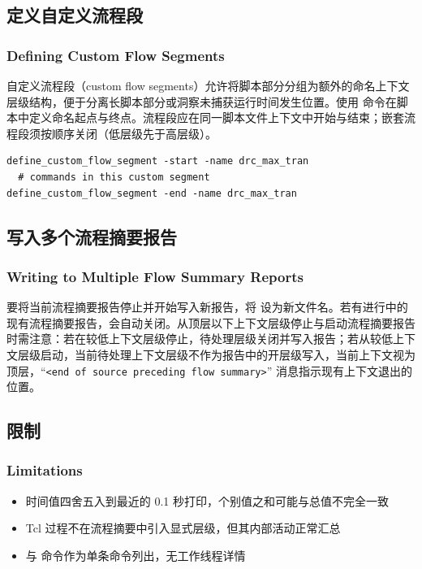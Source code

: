 \subsection{定义自定义流程段}
\subsubsection*{Defining Custom Flow Segments}

自定义流程段（custom flow segments）允许将脚本部分分组为额外的命名上下文层级结构，便于分离长脚本部分或洞察未捕获运行时间发生位置。使用  命令在脚本中定义命名起点与终点。流程段应在同一脚本文件上下文中开始与结束；嵌套流程段须按顺序关闭（低层级先于高层级）。
\begin{lstlisting}
define_custom_flow_segment -start -name drc_max_tran
  # commands in this custom segment
define_custom_flow_segment -end -name drc_max_tran
\end{lstlisting}

\subsection{写入多个流程摘要报告}
\subsubsection*{Writing to Multiple Flow Summary Reports}

要将当前流程摘要报告停止并开始写入新报告，将  设为新文件名。若有进行中的现有流程摘要报告，会自动关闭。从顶层以下上下文层级停止与启动流程摘要报告时需注意：若在较低上下文层级停止，待处理层级关闭并写入报告；若从较低上下文层级启动，当前待处理上下文层级不作为报告中的开层级写入，当前上下文视为顶层，``\texttt{<end of source preceding flow summary>}'' 消息指示现有上下文退出的位置。

\subsection{限制}
\subsubsection*{Limitations}

\begin{itemize}
  \item 时间值四舍五入到最近的 0.1 秒打印，个别值之和可能与总值不完全一致
  \item Tcl 过程不在流程摘要中引入显式层级，但其内部活动正常汇总
  \item {} 与  命令作为单条命令列出，无工作线程详情
\end{itemize}

